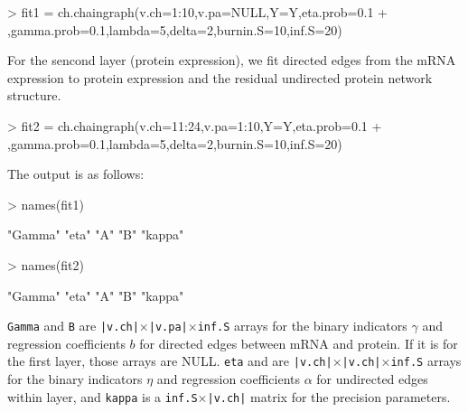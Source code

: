 \documentclass{article}
\begin{document}
\begin{Schunk}
\begin{Sinput}
> fit1 = ch.chaingraph(v.ch=1:10,v.pa=NULL,Y=Y,eta.prob=0.1
+                     ,gamma.prob=0.1,lambda=5,delta=2,burnin.S=10,inf.S=20)
\end{Sinput}
\end{Schunk}
For the sencond layer (protein expression), we fit directed edges from the mRNA expression to protein expression and the residual undirected protein network structure.
\begin{Schunk}
\begin{Sinput}
> fit2 = ch.chaingraph(v.ch=11:24,v.pa=1:10,Y=Y,eta.prob=0.1
+                     ,gamma.prob=0.1,lambda=5,delta=2,burnin.S=10,inf.S=20)
\end{Sinput}
\end{Schunk}
The output is as follows:
\begin{Schunk}
\begin{Sinput}
> names(fit1)
\end{Sinput}
\begin{Soutput}
[1] "Gamma" "eta"   "A"     "B"     "kappa"
\end{Soutput}
\begin{Sinput}
> names(fit2)
\end{Sinput}
\begin{Soutput}
[1] "Gamma" "eta"   "A"     "B"     "kappa"
\end{Soutput}
\end{Schunk}
\texttt{Gamma} and \texttt{B} are \texttt{|v.ch|}$\times$\texttt{|v.pa|}$\times$\texttt{inf.S} arrays for the binary indicators $\gamma$ and regression coefficients $b$ for directed edges between mRNA and protein. If it is for the first layer, those arrays are NULL. \texttt{eta} and  are \texttt{|v.ch|}$\times$\texttt{|v.ch|}$\times$\texttt{inf.S} arrays for the binary indicators $\eta$ and regression coefficients $\alpha$ for undirected edges within layer, and \texttt{kappa} is a \texttt{inf.S}$\times$\texttt{|v.ch|} matrix for the precision parameters.
\end{document}
